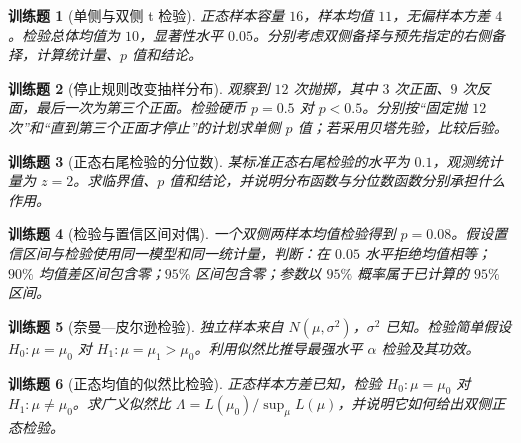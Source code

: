 \documentclass[UTF8,12pt,a4paper,fontset=fandol]{ctexbook}
\newtheorem{exercise}{训练题}[section]
\begin{document}
\begin{exercise}[单侧与双侧 t 检验]\label{q:M-P9-1}
正态样本容量 $16$，样本均值 $11$，无偏样本方差 $4$。检验总体均值为 $10$，显著性水平 $0.05$。分别考虑双侧备择与预先指定的右侧备择，计算统计量、$p$ 值和结论。\par{}\end{exercise}

\begin{exercise}[停止规则改变抽样分布]\label{q:M-P9-2}
观察到 $12$ 次抛掷，其中 $3$ 次正面、$9$ 次反面，最后一次为第三个正面。检验硬币 $p=0.5$ 对 $p<0.5$。分别按“固定抛 $12$ 次”和“直到第三个正面才停止”的计划求单侧 $p$ 值；若采用贝塔先验，比较后验。\par{}\end{exercise}

\begin{exercise}[正态右尾检验的分位数]\label{q:M-E2-II4}
某标准正态右尾检验的水平为 $0.1$，观测统计量为 $z=2$。求临界值、$p$ 值和结论，并说明分布函数与分位数函数分别承担什么作用。\par{}\end{exercise}

\begin{exercise}[检验与置信区间对偶]\label{q:M-F-C10}
一个双侧两样本均值检验得到 $p=0.08$。假设置信区间与检验使用同一模型和同一统计量，判断：在 $0.05$ 水平拒绝均值相等；$90\%$ 均值差区间包含零；$95\%$ 区间包含零；参数以 $95\%$ 概率属于已计算的 $95\%$ 区间。\par{}\end{exercise}

\begin{exercise}[奈曼—皮尔逊检验]\label{q:B14.1}
独立样本来自 $N(\mu,\sigma^2)$，$\sigma^2$ 已知。检验简单假设 $H_0:\mu=\mu_0$ 对 $H_1:\mu=\mu_1>\mu_0$。利用似然比推导最强水平 $\alpha$ 检验及其功效。\par{}\end{exercise}

\begin{exercise}[正态均值的似然比检验]\label{q:B14.2}
正态样本方差已知，检验 $H_0:\mu=\mu_0$ 对 $H_1:\mu\ne\mu_0$。求广义似然比 $\Lambda=L(\mu_0)/\sup_\mu L(\mu)$，并说明它如何给出双侧正态检验。\par{}\end{exercise}
\end{document}
